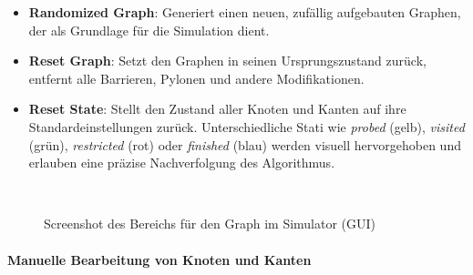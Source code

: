 \documentclass[main.tex]{subfiles} %
\begin{document}
\begin{itemize}
  \item \textbf{Randomized Graph}:
    Generiert einen neuen, zufällig aufgebauten Graphen, der als
    Grundlage für die Simulation dient.

  \item \textbf{Reset Graph}:
    Setzt den Graphen in seinen Ursprungszustand zurück, entfernt
    alle Barrieren, Pylonen und andere Modifikationen.

  \item \textbf{Reset State}:
    Stellt den Zustand aller Knoten und Kanten auf ihre
    Standardeinstellungen zurück. Unterschiedliche Stati wie
    \emph{probed} (gelb), \emph{visited} (grün), \emph{restricted}
    (rot) oder \emph{finished} (blau) werden visuell hervorgehoben
    und erlauben eine präzise Nachverfolgung des Algorithmus.
\end{itemize}

\begin{figure}[H]
  \centering
  \caption{Screenshot des Bereichs für den Graph im Simulator (GUI)}~\label{fig:DashboardGraph}
\end{figure}

\paragraph{Manuelle Bearbeitung von Knoten und Kanten}
\end{document}
